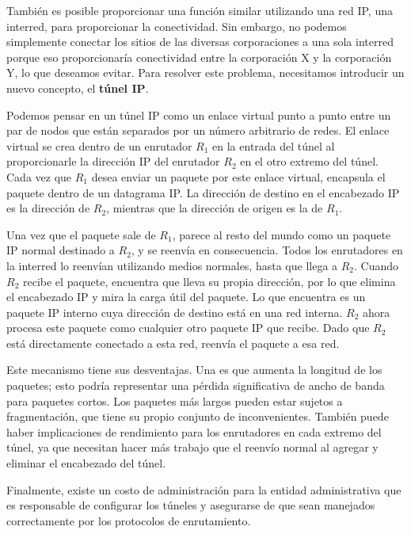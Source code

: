 También es posible proporcionar una función similar utilizando una red IP, una interred, para proporcionar la conectividad. Sin embargo, no podemos simplemente conectar los sitios de las diversas corporaciones a una sola interred porque eso proporcionaría conectividad entre la corporación X y la corporación Y, lo que deseamos evitar. Para resolver este problema, necesitamos introducir un nuevo concepto, el \textbf{túnel IP}.

Podemos pensar en un túnel IP como un enlace virtual punto a punto entre un par de nodos que están separados por un número arbitrario de redes. El enlace virtual se crea dentro de un enrutador \(R_1\) en la entrada del túnel al proporcionarle la dirección IP del enrutador \(R_2\) en el otro extremo del túnel. Cada vez que \(R_1\) desea enviar un paquete por este enlace virtual, encapsula el paquete dentro de un datagrama IP. La dirección de destino en el encabezado IP es la dirección de \(R_2\), mientras que la dirección de origen es la de \(R_1\).

Una vez que el paquete sale de \(R_1\), parece al resto del mundo como un paquete IP normal destinado a \(R_2\), y se reenvía en consecuencia. Todos los enrutadores en la interred lo reenvían utilizando medios normales, hasta que llega a \(R_2\). Cuando \(R_2\) recibe el paquete, encuentra que lleva su propia dirección, por lo que elimina el encabezado IP y mira la carga útil del paquete. Lo que encuentra es un paquete IP interno cuya dirección de destino está en una red interna. \(R_2\) ahora procesa este paquete como cualquier otro paquete IP que recibe. Dado que \(R_2\) está directamente conectado a esta red, reenvía el paquete a esa red.

Este mecanismo tiene sus desventajas. Una es que aumenta la longitud de los paquetes; esto podría representar una pérdida significativa de ancho de banda para paquetes cortos. Los paquetes más largos pueden estar sujetos a fragmentación, que tiene su propio conjunto de inconvenientes. También puede haber implicaciones de rendimiento para los enrutadores en cada extremo del túnel, ya que necesitan hacer más trabajo que el reenvío normal al agregar y eliminar el encabezado del túnel.

Finalmente, existe un costo de administración para la entidad administrativa que es responsable de configurar los túneles y asegurarse de que sean manejados correctamente por los protocolos de enrutamiento.
